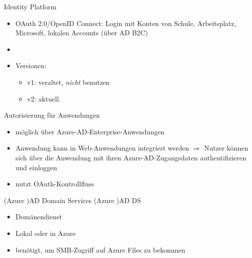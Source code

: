 \begin{flashcard}[Definition]{Identity Platform}
  \begin{itemize}
    \item OAuth 2.0/OpenID Connect: Login mit Konten von Schule, Arbeitsplatz, Microsoft, lokalen Accounts (über AD B2C)
    \item
    \item Versionen:
      \begin{itemize}
        \item v1: veraltet, \emph{nicht} benutzen
        \item v2: aktuell.
      \end{itemize}

  \end{itemize}
\end{flashcard}



\begin{flashcard}[Definition]{Autorisierung für Anwendungen}
  \begin{itemize}
    \item möglich über Azure-AD-Enterprise-Anwendungen
    \item Anwendung kann in Web-Anwendungen integriert werden\newline
      $\Rightarrow$ Nutzer können sich über die Anwendung mit ihren Azure-AD-Zugangsdaten authentifizieren und einloggen
    \item nutzt OAuth-Kontrollfluss
  \end{itemize}
\end{flashcard}

\begin{flashcard}[Definition]{(Azure )AD Domain Services}
  (Azure )AD DS
  \begin{itemize}
    \item Domänendienst
    \item Lokal oder in Azure
    \item benötigt, um SMB-Zugriff auf Azure Files zu bekommen
  \end{itemize}
\end{flashcard}

